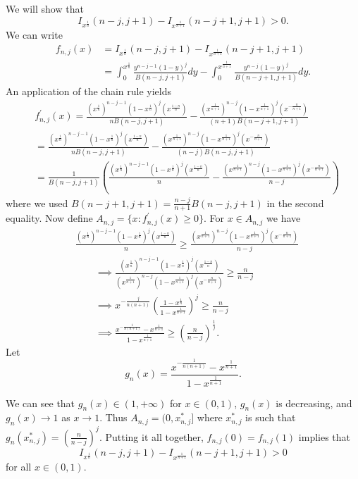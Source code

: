 \documentclass[12pt]{article}
\newcommand{\xn}{x^{\frac{1}{n}}}
\newcommand{\xnone}{x^{\frac{1}{n+1}}}
\begin{document}
\newpage

We will show that 
$$
  I_{\xn}(n-j, j+1) - I_{\xnone}(n-j+1, j+1) > 0.
$$
We can write
\begin{align*}
  f_{n,j}(x) & = I_{\xn}(n-j, j+1) - I_{\xnone}(n-j+1, j+1) \\
  &= \int_0^{\xn}\frac{y^{n-j-1}(1-y)^j}{B(n-j,j+1)}dy 
    - \int_0^{\xnone}\frac{y^{n-j}(1-y)^j}{B(n-j+1,j+1)}dy.
\end{align*}
An application of the chain rule yields 
\begin{align*}
  &f_{n,j}^\prime(x) = \frac{\left(\xn\right)^{n-j-1}\left(1-\xn\right)^j\left(x^{\frac{1-n}{n}}\right)}{nB(n-j,j+1)} 
    - \frac{\left(\xnone\right)^{n-j}\left(1-\xnone\right)^j\left(x^{-\frac{n}{n+1}}\right)}{(n+1)B(n-j+1,j+1)} \\
  &= \frac{\left(\xn\right)^{n-j-1}\left(1-\xn\right)^j\left(x^{\frac{1-n}{n}}\right)}{nB(n-j,j+1)} 
    - \frac{\left(\xnone\right)^{n-j}\left(1-\xnone\right)^j\left(x^{-\frac{n}{n+1}}\right)}{(n-j)B(n-j,j+1)} \\    
  &= \frac{1}{B(n-j,j+1)}\left(\frac{\left(\xn\right)^{n-j-1}\left(1-\xn\right)^j\left(x^{\frac{1-n}{n}}\right)}{n} 
    - \frac{\left(\xnone\right)^{n-j}\left(1-\xnone\right)^j\left(x^{-\frac{n}{n+1}}\right)}{n-j}\right)
\end{align*}
where we used $B(n-j+1,j+1) = \frac{n-j}{n+1}B(n-j,j+1)$ in the second equality. Now define $A_{n,j} = \{x:f_{n,j}^\prime(x) \geq 0\}$. For $x \in A_{n,j}$ we have
\begin{align*}
	&\frac{\left(\xn\right)^{n-j-1}\left(1-\xn\right)^j\left(x^{\frac{1-n}{n}}\right)}{n} 
    \geq \frac{\left(\xnone\right)^{n-j}\left(1-\xnone\right)^j\left(x^{-\frac{n}{n+1}}\right)}{n-j} \\
    &\qquad\implies \frac{\left(\xn\right)^{n-j-1}\left(1-\xn\right)^j\left(x^{\frac{1-n}{n}}\right)}{\left(\xnone\right)^{n-j}\left(1-\xnone\right)^j\left(x^{-\frac{n}{n+1}}\right)} \geq \frac{n}{n-j} \\
    &\qquad\implies x^{-\frac{j}{n(n+1)}}\left(\frac{1-\xn}{1-\xnone}\right)^j \geq \frac{n}{n-j} \\
    &\qquad\implies \frac{x^{-\frac{1}{n(n+1)}}-\xnone}{1-\xnone} \geq \left(\frac{n}{n-j}\right)^\frac{1}{j}.
\end{align*}
Let 
$$
  g_n(x) = \frac{x^{-\frac{1}{n(n+1)}}-\xnone}{1-\xnone}.
$$

We can see that $g_n(x) \in (1,+\infty)$ for $x \in (0,1)$, $g_n(x)$ is decreasing, and $g_n(x)\to1$ as $x\to1$. Thus $A_{n,j} = (0,x^*_{n,j}]$ where $x^*_{n,j}$ is such that $g_n(x^*_{n,j}) = (\frac{n}{n-j})^j$. Putting it all together, $f_{n,j}(0) = f_{n,j}(1)$ implies that 
$$
  I_{\xn}(n-j, j+1) - I_{\xnone}(n-j+1, j+1) > 0
$$
for all $x \in (0,1).$
\end{document}
